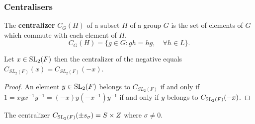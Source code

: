 
\subsubsection{Centralisers}

\begin{definition}[Centralizer]
The \textbf{centralizer} $C_G(H)$ of a subset $H$ of a group $G$ is the set of elements of $G$ which commute with each element of $H$.
\begin{equation*} 
    C_G(H) = \{ g \in G  : gh=hg, \quad \forall h\in L \}. \end{equation*} 
\end{definition}

\begin{corollary}
    \label{centralizer_neg_eq_centralizer}
    \leanok
    Let $x \in \operatorname{SL}_2(F)$ then the centralizer of the negative equals $C_{SL_2(F)}(x) = C_{SL_2(F)}(-x)$.
\end{corollary}
\begin{proof}
    \leanok
 An element $y \in \operatorname{SL}_2(F)$ belongs to $C_{SL_2(F)}$ if and only if
  $1 = x y x^{-1} y^{-1} = (-x) y (-x^{-1}) y^{-1}$  if and only if $y$ belongs to $C_{\operatorname{SL}_2(F)}(-x)$.
\end{proof}

    

\begin{proposition}
\label{centralizer_s_eq_SZ}
\leanok
The centralizer $C_{\operatorname{SL}_2(F)}(\pm s_\sigma) =  S \times Z $ where $\sigma \neq 0$.
\end{proposition}

